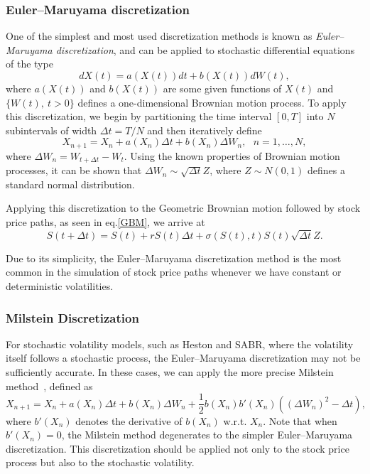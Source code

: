 \subsubsection{Euler–Maruyama discretization}
One of the simplest and most used discretization methods is known as \emph{Euler–Maruyama discretization}, and can be applied to stochastic differential equations of the type
\begin{equation}\label{SDE}
dX(t)=a(X(t))dt+b(X(t))dW(t),
\end{equation}
\noindent where $a(X(t))$ and $b(X(t))$ are some given functions of $X(t)$ and $\{W(t),\ t>0\}$ defines a one-dimensional Brownian motion process.
To apply this discretization, we begin by partitioning the time interval $[0,T]$ into $N$ subintervals of width $\Delta t=T/N$ and then iteratively define
\begin{equation}
X_{n+1}=X_n+a(X_n)\Delta t+b(X_n)\Delta W_n,\ \ \ n=1,\ldots,N,
\end{equation}
\noindent where $\Delta W_n=W_{t+\Delta t}-W_{t}$.
Using the known properties of Brownian motion processes, it can be shown that $\Delta W_n\sim \sqrt{\Delta t}Z$, where $Z\sim N(0,1)$ defines a standard normal distribution.

Applying this discretization to the Geometric Brownian motion followed by stock price paths, as seen in eq.\eqref{GBM}, we arrive at
\begin{equation}
S(t+\Delta t)=S(t)+rS(t)\Delta t+\sigma(S(t),t)S(t)\sqrt{\Delta t}Z.
\end{equation}

Due to its simplicity, the Euler–Maruyama discretization method is the most common in the simulation of stock price paths whenever we have constant or deterministic volatilities.


\subsubsection{Milstein Discretization}
For stochastic volatility models, such as Heston and SABR, where the volatility itself follows a stochastic process, the Euler–Maruyama discretization may not be sufficiently accurate. In these cases, we can apply the more precise Milstein method~\cite{Milstein}, defined as
\begin{equation}
X_{n+1}=X_n+a(X_n)\Delta t+b(X_n)\Delta W_n+\frac{1}{2}b(X_n)b'(X_n)((\Delta W_n)^2-\Delta t),
\end{equation}
\noindent where $b'(X_n)$ denotes the derivative of $b(X_n)$ w.r.t. $X_n$. Note that when $b'(X_n)=0$, the Milstein method degenerates to the simpler Euler–Maruyama discretization. This discretization should be applied not only to the stock price process but also to the stochastic volatility.


